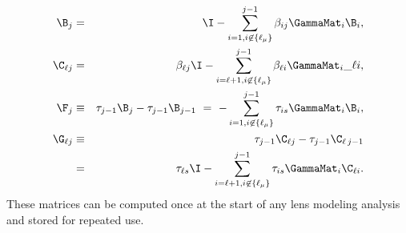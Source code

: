\begin{eqnarray}
\B_j &=& \I - \sum\limits_{i=1,i\not \in \{\ell_\mu\}}^{j-1}\beta_{ij}\GammaMat_i \B_i, \\
\C_{\ell j} &=& \beta_{\ell j} \I - \sum\limits_{i=\ell+1, i\not\in\{\ell_\mu\}}^{j-1} \beta_{\ell i}\GammaMat_i\_{\ell i}, \\
\F_j &\equiv& \tau_{j-1} \B_{j}-\tau_{j-1} \B_{j-1}
  \ =\ - \sum\limits_{i=1,i\not \in \{\ell_\mu\}}^{j-1} \tau_{is}\GammaMat_i\B_i, \\
\G_{\ell j}&\equiv& \tau_{j-1} \C_{\ell j}-\tau_{j-1} \C_{\ell \,j-1}
  \nonumber \\
 &=&\ \tau_{\ell s}\I- \sum\limits_{i=\ell+1,i \not \in \{\ell_\mu\}}^{j-1} \tau_{is}\GammaMat_i\C_{\ell i}.
\end{eqnarray}
These matrices can be computed once at the start of any lens modeling analysis and stored for repeated use.
  
  
  
  
  